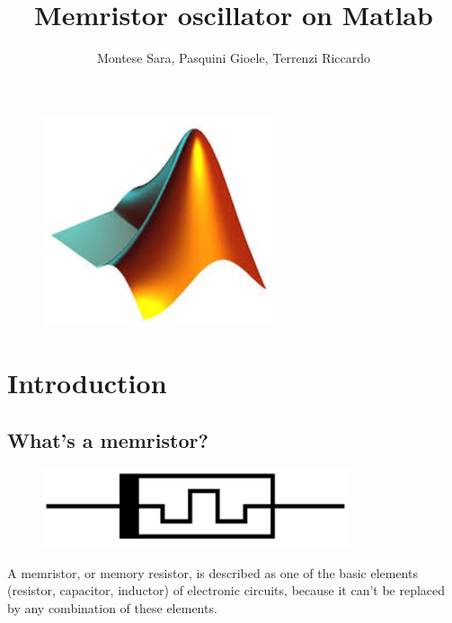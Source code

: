 \documentclass[12pt, a4paper]{paper}
\begin{document}
\author{Montese Sara, Pasquini Gioele, Terrenzi Riccardo}

\title{Memristor oscillator on Matlab}
\maketitle
\begin{figure}[h]
\centering
\includegraphics[width=0.6\textwidth]{matsimbol_1.eps}
\end{figure}
\newpage
\tableofcontents
\newpage

\section{Introduction}
\subsection{What's a memristor?}
\begin{figure}[h]
\centering
\includegraphics[width=0.8\textwidth]{mem2.eps}
\end{figure}
A memristor, or memory resistor, is described as one of the basic elements (resistor, capacitor, inductor) of electronic circuits, because it can’t be replaced by any combination of these elements.
\end{document}

